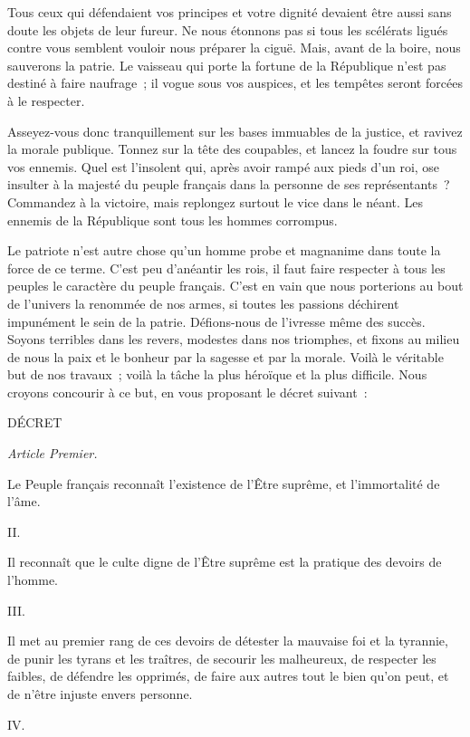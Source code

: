\documentclass[french,twoside]{book} %
\begin{document}
Tous ceux qui défendaient vos principes et votre dignité devaient être aussi sans doute les objets de leur fureur. Ne nous étonnons pas si tous les scélérats ligués contre vous semblent vouloir nous préparer la ciguë. Mais, avant de la boire, nous sauverons la patrie. Le vaisseau qui porte la fortune de la République n’est pas destiné à faire naufrage ; il vogue sous vos auspices, et les tempêtes seront forcées à le respecter.\par
Asseyez-vous donc tranquillement sur les bases immuables de la justice, et ravivez la morale publique. Tonnez sur la tête des coupables, et lancez la foudre sur tous vos ennemis. Quel est l’insolent qui, après avoir rampé aux pieds d’un roi, ose insulter à la majesté du peuple français dans la personne de ses représentants ? Commandez à la victoire, mais replongez surtout le vice dans le néant. Les ennemis de la République sont tous les hommes corrompus.\par
Le patriote n’est autre chose qu’un homme probe et magnanime dans toute la force de ce terme. C’est peu d’anéantir les rois, il faut faire respecter à tous les peuples le caractère du peuple français. C’est en vain que nous porterions au bout de l’univers la renommée de nos armes, si toutes les passions déchirent impunément le sein de la patrie. Défions-nous de l’ivresse même des succès. Soyons terribles dans les revers, modestes dans nos triomphes, et fixons au milieu de nous la paix et le bonheur par la sagesse et par la morale. Voilà le véritable but de nos travaux ; voilà la tâche la plus héroïque et la plus difficile. Nous croyons concourir à ce but, en vous proposant le décret suivant :\par
\par
DÉCRET\par
 {\itshape Article Premier.} \par
Le Peuple français reconnaît l’existence de l’Être suprême, et l’immortalité de l’âme.\par
II.\par
Il reconnaît que le culte digne de l’Être suprême est la pratique des devoirs de l’homme.\par
III.\par
Il met au premier rang de ces devoirs de détester la mauvaise foi et la tyrannie, de punir les tyrans et les traîtres, de secourir les malheureux, de respecter les faibles, de défendre les opprimés, de faire aux autres tout le bien qu’on peut, et de n’être injuste envers personne.\par
IV.\par
\end{document}
